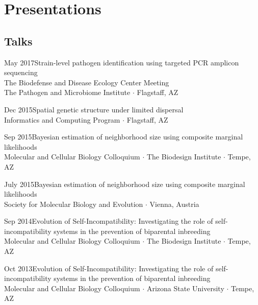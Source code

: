 \documentclass[]{cv-style}          %
\begin{document}
\section{Presentations}
\subsection{Talks}
\begin{entrylist}
\entry
{May 2017}{\normalfont Strain-level pathogen identification using targeted PCR amplicon sequencing}{\\The Biodefense and Disease Ecology Center Meeting\\The Pathogen and Microbiome Institute $\cdotp$ Flagstaff, AZ}
{\vspace{-0.3cm}}
\end{entrylist}
\begin{entrylist}
\entry
{Dec 2015}{\normalfont Spatial genetic structure under limited dispersal}{\\Informatics and Computing Program  $\cdotp$ Flagstaff, AZ}
{\vspace{-0.3cm}}
\end{entrylist}
\begin{entrylist}
\entry
{Sep 2015}{\normalfont Bayesian estimation of neighborhood size using composite marginal likelihoods}{\\Molecular and Cellular Biology Colloquium $\cdot$ The Biodesign Institute $\cdot$ Tempe, AZ}
{\vspace{-0.3cm}}
\end{entrylist}
\begin{entrylist}
\entry
{July 2015}{\normalfont Bayesian estimation of neighborhood size using composite marginal likelihoods}{\\Society for Molecular Biology and Evolution $\cdotp$ Vienna, Austria}
{\vspace{-0.3cm}}
\end{entrylist}
\begin{entrylist}
\entry
{Sep 2014}{\normalfont Evolution of Self-Incompatibility: Investigating the role of self-incompatibility systems in the prevention of biparental inbreeding}{\\Molecular and Cellular Biology Colloquium $\cdot$ The Biodesign Institute $\cdot$ Tempe, AZ}
{\vspace{-0.3cm}}
\end{entrylist}
\begin{entrylist}
\entry
{Oct 2013}{\normalfont Evolution of Self-Incompatibility: Investigating the role of self-incompatibility systems in the prevention of biparental inbreeding}{\\Molecular and Cellular Biology Colloquium $\cdot$ Arizona State University $\cdot$ Tempe, AZ}
{\vspace{-0.3cm}}
\end{entrylist}
\end{document}
